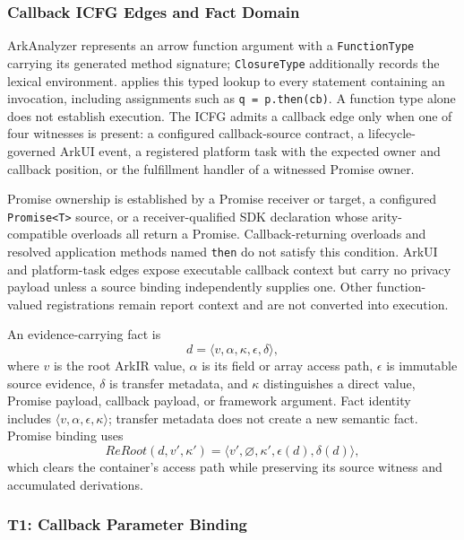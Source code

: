 \subsubsection{Callback ICFG Edges and Fact Domain}

ArkAnalyzer represents an arrow function argument with a \texttt{FunctionType} carrying its generated method signature; \texttt{ClosureType} additionally records the lexical environment. \mytool applies this typed lookup to every statement containing an invocation, including assignments such as \texttt{q = p.then(cb)}. A function type alone does not establish execution. The ICFG admits a callback edge only when one of four witnesses is present: a configured callback-source contract, a lifecycle-governed ArkUI event, a registered platform task with the expected owner and callback position, or the fulfillment handler of a witnessed Promise owner.

Promise ownership is established by a Promise receiver or target, a configured \texttt{Promise<T>} source, or a receiver-qualified SDK declaration whose arity-compatible overloads all return a Promise. Callback-returning overloads and resolved application methods named \texttt{then} do not satisfy this condition. ArkUI and platform-task edges expose executable callback context but carry no privacy payload unless a source binding independently supplies one. Other function-valued registrations remain report context and are not converted into execution.

An evidence-carrying fact is
\begin{equation}
d=\langle v,\alpha,\kappa,\epsilon,\delta\rangle,
\end{equation}
where $v$ is the root ArkIR value, $\alpha$ is its field or array access path, $\epsilon$ is immutable source evidence, $\delta$ is transfer metadata, and $\kappa$ distinguishes a direct value, Promise payload, callback payload, or framework argument. Fact identity includes $\langle v,\alpha,\epsilon,\kappa\rangle$; transfer metadata does not create a new semantic fact. Promise binding uses
\begin{equation}
\mathit{ReRoot}(d,v',\kappa')=
\langle v',\varnothing,\kappa',\epsilon(d),\delta(d)\rangle,
\end{equation}
which clears the container's access path while preserving its source witness and accumulated derivations.

\subsubsection{T1: Callback Parameter Binding}

